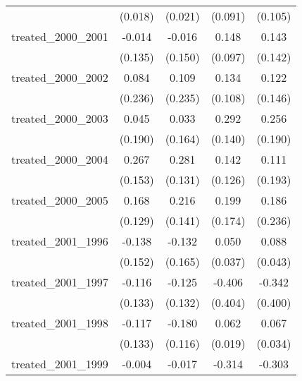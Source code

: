 {\begin{tabular}{l*{4}{c}}
            &     (0.018)         &     (0.021)         &     (0.091)         &     (0.105)         \\
[1em]
treated\_2000\_2001&      -0.014         &      -0.016         &       0.148         &       0.143         \\
            &     (0.135)         &     (0.150)         &     (0.097)         &     (0.142)         \\
[1em]
treated\_2000\_2002&       0.084         &       0.109         &       0.134         &       0.122         \\
            &     (0.236)         &     (0.235)         &     (0.108)         &     (0.146)         \\
[1em]
treated\_2000\_2003&       0.045         &       0.033         &       0.292\sym{*}  &       0.256         \\
            &     (0.190)         &     (0.164)         &     (0.140)         &     (0.190)         \\
[1em]
treated\_2000\_2004&       0.267         &       0.281\sym{*}  &       0.142         &       0.111         \\
            &     (0.153)         &     (0.131)         &     (0.126)         &     (0.193)         \\
[1em]
treated\_2000\_2005&       0.168         &       0.216         &       0.199         &       0.186         \\
            &     (0.129)         &     (0.141)         &     (0.174)         &     (0.236)         \\
[1em]
treated\_2001\_1996&      -0.138         &      -0.132         &       0.050         &       0.088\sym{*}  \\
            &     (0.152)         &     (0.165)         &     (0.037)         &     (0.043)         \\
[1em]
treated\_2001\_1997&      -0.116         &      -0.125         &      -0.406         &      -0.342         \\
            &     (0.133)         &     (0.132)         &     (0.404)         &     (0.400)         \\
[1em]
treated\_2001\_1998&      -0.117         &      -0.180         &       0.062\sym{**} &       0.067         \\
            &     (0.133)         &     (0.116)         &     (0.019)         &     (0.034)         \\
[1em]
treated\_2001\_1999&      -0.004         &      -0.017         &      -0.314         &      -0.303         \\

\end{tabular}}
